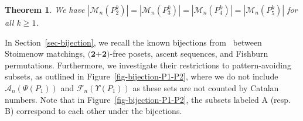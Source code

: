 \documentclass[11pt]{article}
\newtheorem{thm}{Theorem}[section]
\newcommand{\M}{\mathcal{M}}
\begin{document}
	\begin{thm}\label{thm1-general}   We have $|\M_n(P^k_2)|=|\M_n(P^k_3)|=|\M_n(P^k_4)|=|\M_n(P^k_5)|$ for all $k\geq 1$. \end{thm}
	
	In Section~\ref{sec-bijection}, we recall the known bijections from~\cite{Bousquet-Claesson-Dukes-Kitaev,Claesson-Dukes-Kitaev} between Stoimenow matchings, $\textbf{(2+2)}$-free posets, ascent sequences, and Fishburn permutations. Furthermore, we investigate their restrictions to pattern-avoiding subsets, as outlined in Figure~\ref{fig-bijection-P1-P2}, where we do not include  $\mathcal{A}_n(\Psi(P_1))$ and $\mathcal{F}_n(\Upsilon(P_1))$ as these sets are not counted by Catalan numbers. Note that in Figure~\ref{fig-bijection-P1-P2}, the subsets labeled A (resp. B) correspond to each other under the bijections.
	
\end{document}
